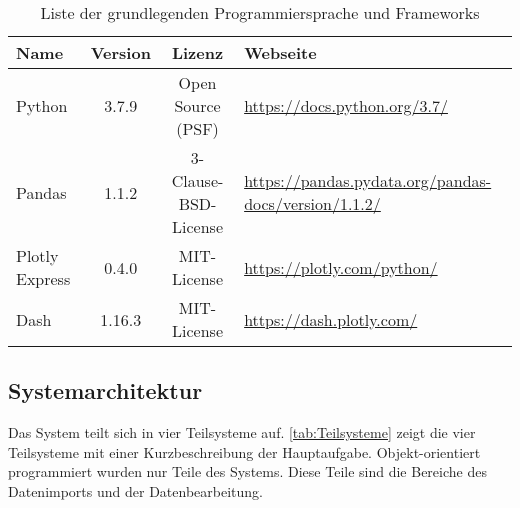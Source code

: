     \begingroup
        \setlength{\tabcolsep}{4pt} %
        \renewcommand{\arraystretch}{1.5}
        \begin{table}[h]
            \centering
            \begin{adjustbox}{max width=\textwidth}
            \Huge
            \begin{tabular}{lccl}
               \toprule
               \textbf{Name}             &{Version}    &\textbf{Lizenz}                        & \textbf{Webseite}\\
               \midrule     
                    Python               &3.7.9         &Open Source (PSF)                     & \url{https://docs.python.org/3.7/}\\
                    Pandas               &1.1.2         &3-Clause-BSD-License                  & \url{https://pandas.pydata.org/pandas-docs/version/1.1.2/}\\
                    Plotly Express       &0.4.0         &MIT-License                           & \url{https://plotly.com/python/}\\
                    Dash                 &1.16.3        &MIT-License                           & \url{https://dash.plotly.com/}\\


                \bottomrule
            \end{tabular}
            \end{adjustbox}
            \caption{%
                Liste der grundlegenden Programmiersprache und Frameworks
            \label{tab:Software-Requirements}
            }
             \end{table}
        \endgroup
    
     
    \subsection{Systemarchitektur}
    
    Das System teilt sich in vier Teilsysteme auf. \autoref{tab:Teilsysteme} zeigt die vier Teilsysteme mit einer Kurzbeschreibung der Hauptaufgabe.
    Objekt-orientiert programmiert wurden nur Teile des Systems. Diese Teile sind die Bereiche des Datenimports und der Datenbearbeitung. 
    
